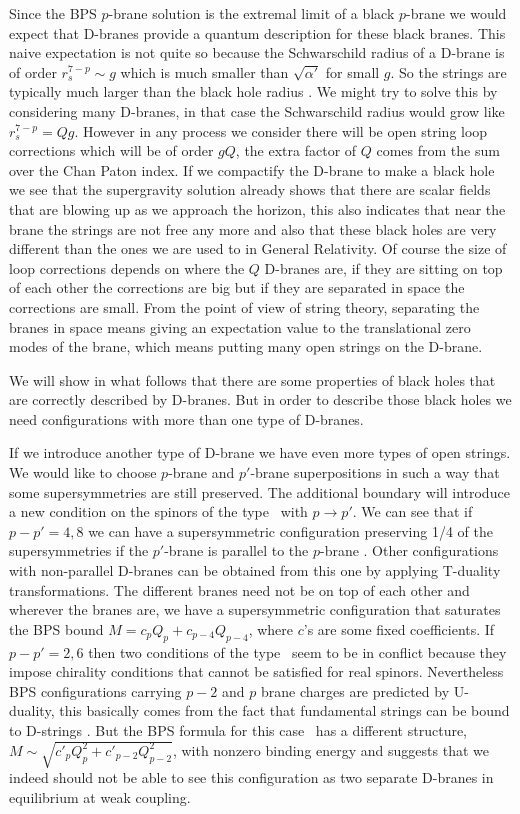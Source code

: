Since the BPS  $p$-brane solution is the extremal 
limit of a black $p$-brane we would expect that  
D-branes provide a quantum description for these black
branes. This  naive expectation is not quite so
because 
the Schwarschild radius of a 
D-brane is of order $r_s^{7-p} \sim   g $ which  is much smaller than
$\sqrt{\alpha'}$ for small $g$. So the strings are typically much 
larger than the black hole radius \polchinskinotes . 
We might try to solve this by considering many D-branes, in
that case the Schwarschild radius would grow like $  r_s^{7-p} =
 Q g $. However in any process we consider there will
be open string loop corrections which will be of 
order $ g Q$, the extra factor of $Q$ comes from the
sum over the Chan Paton index. 
If we compactify the D-brane to make a black hole we 
see that  the supergravity solution already shows that
there are scalar fields that are blowing up  as we approach the
horizon, this also indicates that near the brane the strings are not
free any more and also that these black holes are very different than
the ones  we are used to in General Relativity.
Of course the size of loop corrections depends on  where the 
$Q$ D-branes are, if they are sitting on top of each other the
corrections are big but if they are separated
in space the corrections are small.
From the point of view of string theory, separating the
branes in space means giving an expectation value
to the translational zero modes of the brane, which 
means putting many open strings on the D-brane.


We will show in what follows that there are some 
properties of  black holes that are correctly described by 
D-branes. But in order to describe those black holes we need
configurations with more than one type of D-branes.

If we introduce another type  of D-brane we have even more types 
of open strings. We would like to choose $p$-brane and
$p'$-brane superpositions 
in such a  way that some supersymmetries are  still 
preserved. The additional boundary will introduce a 
new condition on the spinors of the type \susydbrane\ with
$p \rightarrow p'$. We can see that if 
$p-p' = 4,8 $ we can have a supersymmetric configuration
preserving 1/4  of the supersymmetries if the $p'$-brane
is parallel to the $p$-brane \dgl . Other configurations 
with non-parallel D-branes can be obtained from this one
by applying T-duality transformations.
The different branes need not be on top of each other and  wherever
the branes are, we have a supersymmetric configuration that
saturates the BPS bound $ M = c_p Q_p + c_{p-4} Q_{p-4} $, 
where $c$'s are some fixed coefficients.
If $p-p'=2,6$ then two conditions of the type
\susydbrane\ seem to be in conflict because they impose
chirality conditions that cannot be satisfied for
real spinors. 
Nevertheless BPS   configurations carrying
$p-2$ and $p$ brane charges   are
 predicted by U-duality, this
basically comes from the 
fact that fundamental strings can be bound to D-strings
\wittenbound . But the BPS formula for this case  \wittenbound\
has a different structure, 
$M \sim \sqrt{c'_p Q_p^2 + c'_{p-2} Q^2_{p-2} }$,
 with nonzero binding energy 
and suggests that we indeed  should  not
be able to see this configuration as two separate D-branes 
in equilibrium  at weak coupling.

